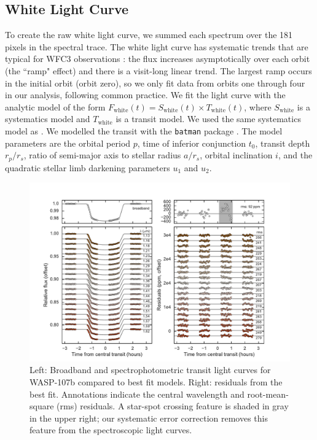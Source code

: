 \documentclass[twocolumn, trackchanges]{aastex61}
\begin{document}
\subsection{White Light Curve}
To create the raw white light curve, we summed each spectrum over the 181 pixels in the spectral trace.  The white light curve has systematic trends that are typical for WFC3 observations \citep{zhou17}: the flux increases asymptotically over each orbit (the ``ramp" effect) and there is a visit-long linear trend. The largest ramp occurs in the initial orbit (orbit zero), so we only fit data from orbits one through four in our analysis, following common practice.  We fit the light curve with the analytic model of the form $F_\mathrm{white}(t) = S_\mathrm{white}(t)\times T_\mathrm{white}(t)$, where $S_\mathrm{white}$ is a systematics model and $T_\mathrm{white}$ is a transit model. We used the same systematics model as \cite{kreidberg15b}.  We modelled the transit with the \texttt{batman} package \citep{kreidberg15a}.  The model parameters are the orbital period $p$, time of inferior conjunction $t_0$, transit depth $r_p/r_s$, ratio of semi-major axis to stellar radius $a/r_s$, orbital inclination $i$, and the quadratic stellar limb darkening parameters $u_1$ and $u_2$.

\begin{figure}
\includegraphics[width = \textwidth]{fig1_lc.pdf}
\caption{Left: Broadband and spectrophotometric transit light curves for WASP-107b compared to best fit models. Right: residuals from the best fit. Annotations indicate the central wavelength and root-mean-square (rms) residuals. A star-spot crossing feature is shaded in gray in the upper right; our systematic error correction removes this feature from the spectroscopic light curves.} 
\label{fig:lc}
\end{figure}
\end{document}
